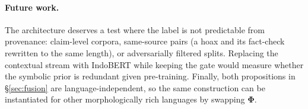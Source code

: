\paragraph{Future work.}
The architecture deserves a test where the label is not predictable from provenance: claim-level corpora,
same-source pairs (a hoax and its fact-check rewritten to the same length), or adversarially filtered
splits. Replacing the contextual stream with IndoBERT while keeping the gate would measure whether the
symbolic prior is redundant given pre-training. Finally, both propositions in \S\ref{sec:fusion} are
language-independent, so the same construction can be instantiated for other morphologically rich
languages by swapping $\bm{\Phi}$.
